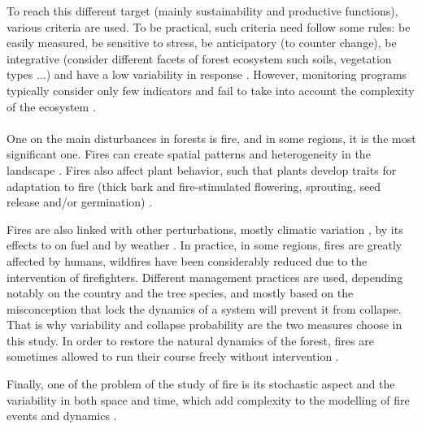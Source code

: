 \documentclass{article}
\begin{document}
To reach this different target (mainly sustainability and productive functions), various criteria are used. To be practical, such criteria need follow some rules: be easily measured, be sensitive to stress, be anticipatory (to counter change), be integrative (consider different facets of forest ecosystem such soils, vegetation types ...) and have a low variability in response \cite{dale_challenges_2001}. However, monitoring programs typically consider only few indicators and fail to take into account the complexity of the ecosystem \cite{dale_challenges_2001}.


\paragraph{}

One on the main disturbances in forests is fire, and in some regions, it is the most significant one. Fires can create spatial patterns and heterogeneity in the landscape \cite{skinner_overview_nodate}. Fires also affect plant behavior, such that plants develop traits for adaptation to fire (thick  bark  and fire-stimulated flowering, sprouting, seed release and/or germination) \cite{mckelvey1996overview} \cite{chang1996ecosystem}.

Fires are also linked with other perturbations, mostly climatic variation \cite{mckenzie_climatic_2004}\cite{da2018dynamics}, by its effects to on fuel \cite{schoennagel_interaction_2004} and by weather \cite{fernandes_fire-smart_2013}. In practice, in some regions, fires are greatly affected by humans, wildfires have been considerably reduced due to the intervention of firefighters. Different management practices are used, depending notably on the country and the tree species, and mostly based on the misconception that lock the dynamics of a system will prevent it from collapse. That is why variability and collapse probability are the two measures choose in this study. In order to restore the natural dynamics of the forest, fires are sometimes allowed to run their course freely without intervention \cite{wallenius2011major}. 

Finally, one of the problem of the study of fire is its stochastic aspect and the variability in both space and time, which add complexity to the modelling of fire events and dynamics \cite{agee1998landscape} \cite{lertzman1998three}.
\end{document}
